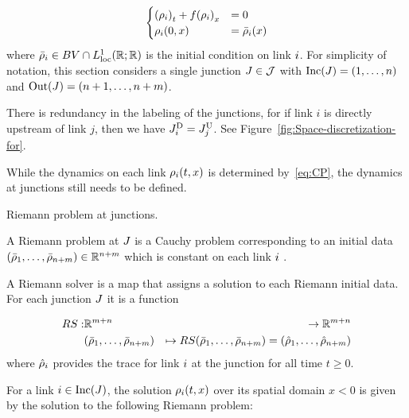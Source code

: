 \begin{equation}
	\begin{cases}
		\left(\cvar_{\link}\right)_{t}+f\left(\cvar_{\link}\right)_{x} & =0                                \\
		\cvar_{\link}\left(0,x\right)                                  & =\initstate_{\link}\left(x\right) 
	\end{cases}\label{eq:cauchy-i}
\end{equation}
where $\initstate_{\link}\in BV\cap L_{\text{loc}}^{1}\left(\mathbb{R};\mathbb{R}\right)$
is the initial condition on link $i$. For simplicity of notation,
this section considers a single junction $J\in\mathcal{J}$ with $\Inc\left(\jn\right)=\left(1,\ldots,\ninc\right)$
and $\Out\left(\jn\right)=\left(\ninc+1,\ldots,\ninc+\nout\right)$.
\begin{rem}
	There is redundancy in the labeling of the junctions, for if link
	$i$ is directly upstream of link $j$, then we have $J_{i}^{\text{D}}=J_{j}^{\text{U}}$.
	See Figure~\ref{fig:Space-discretization-for}.
\end{rem}
While the dynamics on each link $\cvar_{\link}\left(t,x\right)$ is
determined by~\eqref{eq:CP}, the dynamics at junctions
still needs to be defined.
\begin{defn}
	Riemann problem at junctions. 
	
	A Riemann problem at $J$ is a Cauchy problem corresponding to an initial data $\tuple{\initstate_{1}}{\initstate_{\ninc+\nout}}\in\mathbb{R}^{\ninc+\nout}$ which is constant on each link $i$ .
	
\end{defn}
\begin{defn}
	A Riemann solver is a map that assigns a solution to each Riemann initial data. For each junction $J$ it is a function
	
	\begin{eqnarray*}
		\RS: & \mathbb{R}^{m+n} & \rightarrow\mathbb{R}^{m+n}\\
		& \tuple{\initstate_{1}}{\initstate_{\ninc+\nout}} & \mapsto\RS\tuple{\initstate_{1}}{\initstate_{\ninc+\nout}}=\tuple{\trace{\cvar}_{1}}{\trace{\cvar}_{\ninc+\nout}}
	\end{eqnarray*}
	where $\hat{\rho}_{i}$ provides the trace for link $i$
	at the junction for all time $t\ge0$.
	
\end{defn}
For a link $i\in\Inc\left(\jn\right)$,
the solution $\cvar_{i}\left(t,x\right)$ over its spatial domain
$x<0$ is given by the solution to the following Riemann problem:


